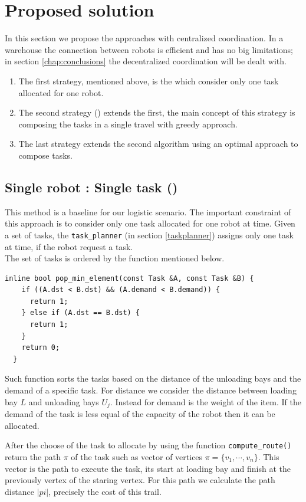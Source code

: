 \section{Proposed solution}

In this section we propose the approaches with centralized coordination.
In a warehouse the connection between robots is efficient and has no big limitations;
in section \ref{chap:conclusions} the decentralized coordination will be dealt with.
\begin{enumerate}
\item The first strategy, mentioned above, is the \srst which consider only 
one task allocated for one robot.

\item The second strategy (\gsp) extends the first, the main concept of this strategy 
is composing the tasks in a single travel with greedy approach. 

\item The last strategy \sps extends the second algorithm using an optimal approach
to compose tasks. 
\end{enumerate}

\subsection{Single robot : Single task (\srst)}

This method is a baseline for our logistic scenario.
The important constraint of this approach is to consider only one task allocated for 
one robot at time.
Given a set of tasks, the \texttt{task\_planner} (in section \ref{taskplanner}) assigns only one task at time,
if the robot request a task.
\\
The set of tasks is ordered by the function mentioned below.
\begin{lstlisting}
inline bool pop_min_element(const Task &A, const Task &B) {
    if ((A.dst < B.dst) && (A.demand < B.demand)) {
      return 1;
    } else if (A.dst == B.dst) {
      return 1;
    }
    return 0;
  }
\end{lstlisting}
Such function sorts the tasks based on the distance of the unloading bays and the demand of a specific task.
For distance we consider the distance between loading bay $L$ and unloading bays $U_j$.
Instead for demand is the weight of the item. If the demand of the task is less equal of 
the capacity of the robot then it can  be allocated.

After the choose of the task to allocate by using the function \texttt{compute\_route()} return the path $\pi$ of the task such as vector of vertices $\pi = \{v_1,\cdots,v_n\}$. 
This vector is the path to execute the task, its start at loading bay and finish at the previously vertex of the staring vertex.
For this path we calculate the path distance $|pi|$, precisely the cost of this trail.

